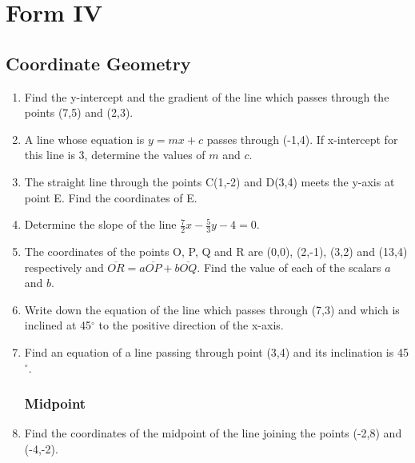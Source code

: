 \section{Form IV}

	\subsection{Coordinate Geometry} \label{f4coordgeo}
	
\begin{enumerate}
	
		\subsubsection{Slope / Equation of a Line}
	\item Find the y-intercept and the gradient of the line which passes through the points (7,5) and (2,3).
	
	\item A line whose equation is $y = mx + c$ passes through (-1,4). If x-intercept for this line is 3, determine the values of $m$ and $c$.
	
	\item The straight line through the points C(1,-2) and D(3,4) meets the y-axis at point E. Find the coordinates of E.
	
	\item Determine the slope of the line $\frac{7}{2}x - \frac{5}{3}y - 4 = 0$.
	
	\item The coordinates of the points O, P, Q and R are (0,0), (2,-1), (3,2) and (13,4) respectively and $\overline{OR} = a \overline{OP} + b \overline{OQ}$. Find the value of each of the scalars $a$ and $b$.
	
	
	
	\item Write down the equation of the line which passes through (7,3) and which is inclined at 45$^\circ$ to the positive direction of the x-axis.
	
	\item Find an equation of a line passing through point (3,4) and its inclination is 45$^\circ$.
	
	
		\subsubsection{Midpoint}
	\item Find the coordinates of the midpoint of the line joining the points (-2,8) and (-4,-2).
	

\end{enumerate}
